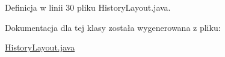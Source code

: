 Definicja w linii 30 pliku History\+Layout.\+java.



Dokumentacja dla tej klasy została wygenerowana z pliku\+:\begin{DoxyCompactItemize}
\item 
\hyperlink{_history_layout_8java}{History\+Layout.\+java}\end{DoxyCompactItemize}
